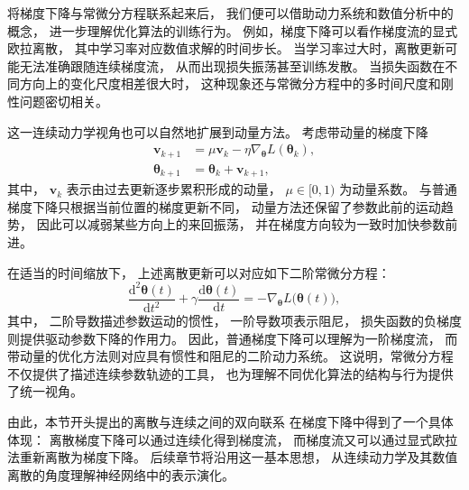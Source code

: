 将梯度下降与常微分方程联系起来后，
我们便可以借助动力系统和数值分析中的概念，
进一步理解优化算法的训练行为。
例如，梯度下降可以看作梯度流的显式欧拉离散，
其中学习率对应数值求解的时间步长。
当学习率过大时，离散更新可能无法准确跟随连续梯度流，
从而出现损失振荡甚至训练发散。
当损失函数在不同方向上的变化尺度相差很大时，
这种现象还与常微分方程中的多时间尺度和刚性问题密切相关。

这一连续动力学视角也可以自然地扩展到动量方法。
考虑带动量的梯度下降
\begin{align}
    \boldsymbol{v}_{k+1}
    &=
    \mu\boldsymbol{v}_{k}
    -
    \eta
    \nabla_{\boldsymbol{\theta}}
    L(\boldsymbol{\theta}_{k}),
    \label{eq:momentum-velocity}
    \\
    \boldsymbol{\theta}_{k+1}
    &=
    \boldsymbol{\theta}_{k}
    +
    \boldsymbol{v}_{k+1},
    \label{eq:momentum-update}
\end{align}
其中，
\(\boldsymbol{v}_{k}\)
表示由过去更新逐步累积形成的动量，
\(\mu\in[0,1)\)
为动量系数。
与普通梯度下降只根据当前位置的梯度更新不同，
动量方法还保留了参数此前的运动趋势，
因此可以减弱某些方向上的来回振荡，
并在梯度方向较为一致时加快参数前进。

在适当的时间缩放下，
上述离散更新可以对应如下二阶常微分方程：
\begin{equation}
    \frac{\mathrm{d}^{2}\boldsymbol{\theta}(t)}
    {\mathrm{d}t^{2}}
    +
    \gamma
    \frac{\mathrm{d}\boldsymbol{\theta}(t)}
    {\mathrm{d}t}
    =
    -
    \nabla_{\boldsymbol{\theta}}
    L\bigl(\boldsymbol{\theta}(t)\bigr),
    \label{eq:heavy-ball-ode}
\end{equation}
其中，
二阶导数描述参数运动的惯性，
一阶导数项表示阻尼，
损失函数的负梯度则提供驱动参数下降的作用力。
因此，普通梯度下降可以理解为一阶梯度流，
而带动量的优化方法则对应具有惯性和阻尼的二阶动力系统。
这说明，常微分方程不仅提供了描述连续参数轨迹的工具，
也为理解不同优化算法的结构与行为提供了统一视角。



由此，本节开头提出的离散与连续之间的双向联系
在梯度下降中得到了一个具体体现：
离散梯度下降可以通过连续化得到梯度流，
而梯度流又可以通过显式欧拉法重新离散为梯度下降。
后续章节将沿用这一基本思想，
从连续动力学及其数值离散的角度理解神经网络中的表示演化。

